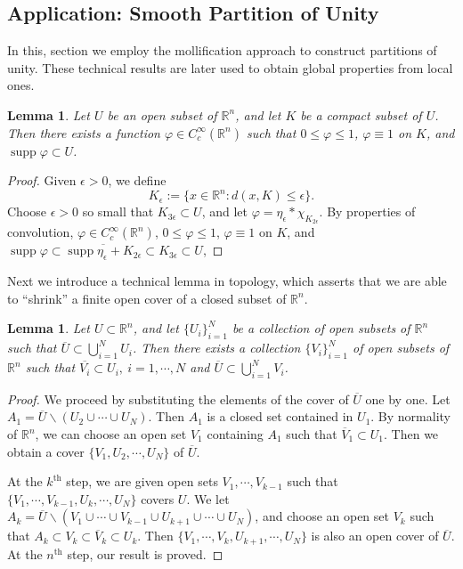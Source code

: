 \documentclass{article}
\numberwithin{equation}{section}
\newcommand{\bbR}{\mathbb{R}}
\newcommand{\ol}{\overline}
\DeclareMathOperator{\supp}{supp}
\theoremstyle{plain}
\newtheorem{lemma}[theorem]{Lemma}
\theoremstyle{definition}
\begin{document}
\subsection{Application: Smooth Partition of Unity}
In this, section we employ the mollification approach to construct partitions of unity. These technical results are later used to obtain global properties from local ones.
\begin{lemma}\label{lemma:1.10}
Let $U$ be an open subset of $\bbR^n$, and let $K$ be a compact subset of $U$. Then there exists a function $\varphi\in C_c^\infty(\bbR^n)$ such that $0\leq\varphi\leq 1$, $\varphi\equiv 1$ on $K$, and $\supp\varphi\subset U$.
\end{lemma}
\begin{proof}
Given $\epsilon>0$, we define $$K_\epsilon:=\{x\in\bbR^n:d(x,K)\leq\epsilon\}.$$ Choose $\epsilon>0$ so small that $K_{3\epsilon}\subset U$, and let $\varphi=\eta_\epsilon*\chi_{K_{2\epsilon}}$. By properties of convolution, $\varphi\in C_c^\infty(\bbR^n)$, $0\leq\varphi\leq 1$, $\varphi\equiv 1$ on $K$, and $\supp\varphi\subset\ol{\supp\eta_\epsilon+K_{2\epsilon}}\subset K_{3\epsilon}\subset U$, 
\end{proof}

Next we introduce a technical lemma in topology, which asserts that we are able to ``shrink'' a finite open cover of a closed subset of $\bbR^n$.
\begin{lemma}\label{lemma:1.11}
Let $U\subset\bbR^n$, and let $\{U_i\}_{i=1}^N$ be a collection of open subsets of $\bbR^n$ such that $\ol{U}\subset\bigcup_{i=1}^N U_i$. Then there exists a collection $\{V_i\}_{i=1}^N$ of open subsets of $\bbR^n$ such that $\ol{V_i}\subset U_i,\ i=1,\cdots,N$ and $\ol{U}\subset\bigcup_{i=1}^N V_i$.
\end{lemma}
\begin{proof}
We proceed by substituting the elements of the cover of $\ol{U}$ one by one. Let $A_1=\ol{U}\backslash(U_2\cup\cdots\cup U_N)$. Then $A_1$ is a closed set contained in $U_1$. By normality of $\bbR^n$, we can choose an open set $V_1$ containing $A_1$ such that $\ol{V}_1\subset U_1$. Then we obtain a cover $\{V_1,U_2,\cdots,U_N\}$ of $\ol{U}$.

At the $k^{\mathrm{th}}$ step, we are given open sets $V_1,\cdots,V_{k-1}$ such that $\{V_1,\cdots,V_{k-1},U_k,\cdots,U_N\}$ covers $U$. We let $A_k=\ol{U}\backslash(V_1\cup\cdots\cup V_{k-1}\cup U_{k+1}\cup\cdots\cup U_N)$, and choose an open set $V_k$ such that $A_k\subset V_k\subset\ol{V}_k\subset U_k$. Then $\{V_1,\cdots,V_k,U_{k+1},\cdots,U_N\}$ is also an open cover of $\ol{U}$. At the $n^{\mathrm{th}}$ step, our result is proved.
\end{proof}
\end{document}
